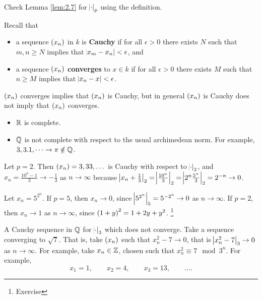 \begin{exercise}
Check Lemma \ref{lem:2.7} for $ \abs{\cdot}_p $ using the definition.
\end{exercise}

\pagebreak

Recall that
\begin{itemize}
\item a sequence $ \br{x_n} $ in $ k $ is \textbf{Cauchy} if for all $ \epsilon > 0 $ there exists $ N $ such that $ m, n \ge N $ implies that $ \abs{x_m - x_n} < \epsilon $, and
\item a sequence $ \br{x_n} $ \textbf{converges} to $ x \in k $ if for all $ \epsilon > 0 $ there exists $ M $ such that $ n \ge M $ implies that $ \abs{x_n - x} < \epsilon $.
\end{itemize}
$ \br{x_n} $ converges implies that $ \br{x_n} $ is Cauchy, but in general $ \br{x_n} $ is Cauchy does not imply that $ \br{x_n} $ converges.

\begin{example*}
\hfill
\begin{itemize}
\item $ \mathbb{R} $ is complete.
\item $ \mathbb{Q} $ is not complete with respect to the usual archimedean norm. For example, $ 3, 3.1, \dots \to \pi \notin \mathbb{Q} $.
\end{itemize}
\end{example*}

\begin{example}
Let $ p = 2 $. Then $ \br{x_n} = 3, 33, \dots $ is Cauchy with respect to $ \abs{\cdot}_2 $, and $ x_n = \tfrac{10^n - 1}{3} \to -\tfrac{1}{3} $ as $ n \to \infty $ because $ \abs{x_n + \tfrac{1}{3}}_2 = \abs{\tfrac{10^n}{3}}_2 = \abs{2^n\tfrac{5^n}{3}}_2 = 2^{-n} \to 0 $.
\end{example}

\begin{example}
Let $ x_n = 5^{2^n} $. If $ p = 5 $, then $ x_n \to 0 $, since $ \abs{5^{2^n}}_5 = 5^{-2^n} \to 0 $ as $ n \to \infty $. If $ p = 2 $, then $ x_n \to 1 $ as $ n \to \infty $, since $ \br{1 + y}^2 = 1 + 2y + y^2 $. \footnote{Exercise}
\end{example}

\begin{example*}
A Cauchy sequence in $ \mathbb{Q} $ for $ \abs{\cdot}_3 $ which does not converge. Take a sequence converging to $ \sqrt{7} $. That is, take $ \br{x_n} $ such that $ x_n^2 - 7 \to 0 $, that is $ \abs{x_n^2 - 7}_3 \to 0 $ as $ n \to \infty $. For example, take $ x_n \in \mathbb{Z} $, chosen such that $ x_n^2 \equiv 7 \mod 3^n $. For example,
$$ x_1 = 1, \qquad x_2 = 4, \qquad x_3 = 13, \qquad \dots. $$
\end{example*}

